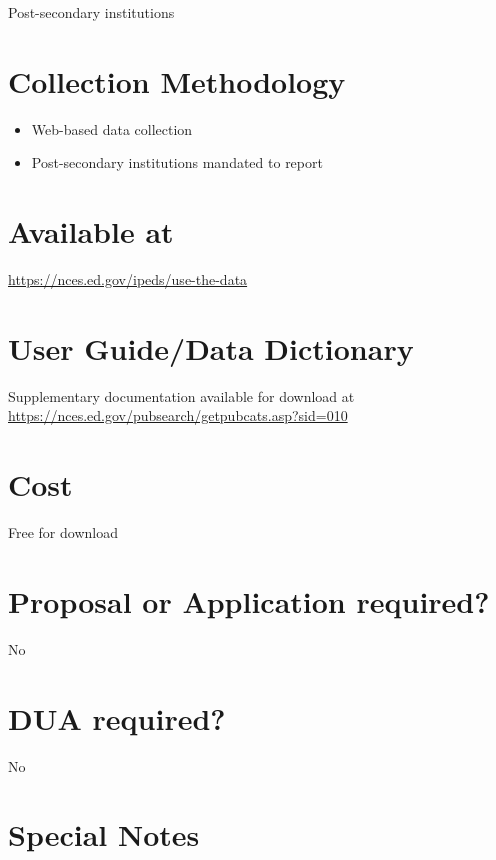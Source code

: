 \documentclass[
]{book}
\providecommand{\tightlist}{%
  \setlength{\itemsep}{0pt}\setlength{\parskip}{0pt}}
\begin{document}
Post-secondary institutions

\hypertarget{collection-methodology-34}{%
\section{Collection Methodology}\label{collection-methodology-34}}

\begin{itemize}
\tightlist
\item
  Web-based data collection
\item
  Post-secondary institutions mandated to report
\end{itemize}

\hypertarget{available-at-34}{%
\section{Available at}\label{available-at-34}}

\url{https://nces.ed.gov/ipeds/use-the-data}

\hypertarget{user-guidedata-dictionary-34}{%
\section{User Guide/Data Dictionary}\label{user-guidedata-dictionary-34}}

Supplementary documentation available for download at \url{https://nces.ed.gov/pubsearch/getpubcats.asp?sid=010}

\hypertarget{cost-34}{%
\section{Cost}\label{cost-34}}

Free for download

\hypertarget{proposal-or-application-required-34}{%
\section{Proposal or Application required?}\label{proposal-or-application-required-34}}

No

\hypertarget{dua-required-34}{%
\section{DUA required?}\label{dua-required-34}}

No

\hypertarget{special-notes-34}{%
\section{Special Notes}\label{special-notes-34}}
\end{document}
